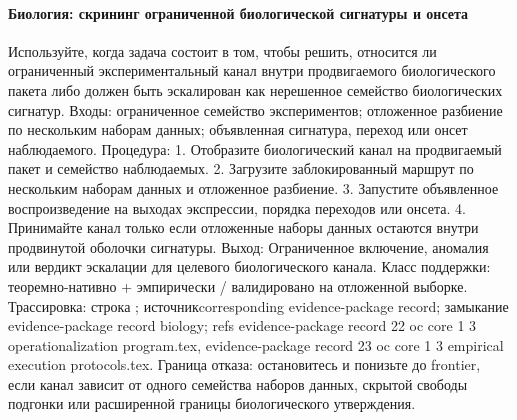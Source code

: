 \paragraph{Биология: скрининг ограниченной биологической сигнатуры и онсета}
Используйте, когда задача состоит в том, чтобы решить, относится ли ограниченный экспериментальный канал внутри продвигаемого биологического пакета либо должен быть эскалирован как нерешенное семейство биологических сигнатур.
Входы: ограниченное семейство экспериментов; \allowbreak отложенное разбиение по нескольким наборам данных; \allowbreak объявленная сигнатура, переход или онсет наблюдаемого.
Процедура: 1. Отобразите биологический канал на продвигаемый пакет и семейство наблюдаемых. 2. Загрузите заблокированный маршрут по нескольким наборам данных и отложенное разбиение. 3. Запустите объявленное воспроизведение на выходах экспрессии, порядка переходов или онсета. 4. Принимайте канал только если отложенные наборы данных остаются внутри продвинутой оболочки сигнатуры.
Выход: Ограниченное включение, аномалия или вердикт эскалации для целевого биологического канала.
Класс поддержки: теоремно-нативно + эмпирически / валидировано на отложенной выборке.
Трассировка: строка ; \allowbreak источникcorresponding evidence-package record; \allowbreak замыкание evidence-package record biology; \allowbreak refs evidence-package record 22 oc core 1 3 operationalization program.tex, \allowbreak evidence-package record 23 oc core 1 3 empirical execution protocols.tex.
Граница отказа: остановитесь и понизьте до frontier, если канал зависит от одного семейства наборов данных, скрытой свободы подгонки или расширенной границы биологического утверждения.

